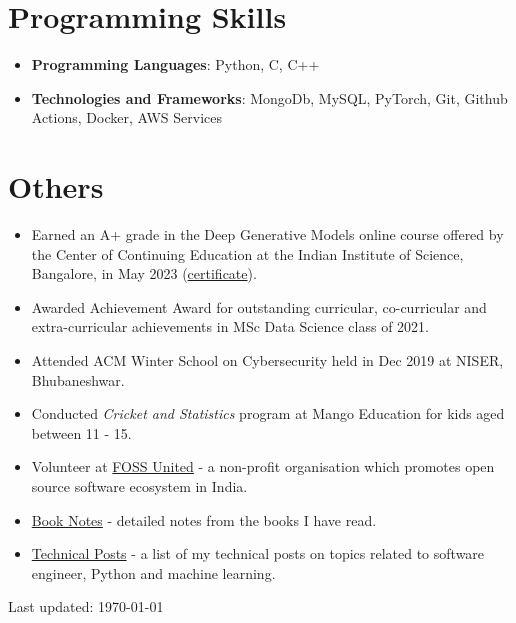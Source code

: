 \documentclass[letterpaper,11pt]{article}
\newcommand{\resumeItemSimple}[1]{
  \item\small{
    {#1 \vspace{-2pt}}
  }
}
\newcommand{\resumeSubItemSimple}[1]{\resumeItemSimple{#1}\vspace{-4pt}}
\newcommand{\resumeSubHeadingListStart}{\begin{itemize}[leftmargin=*]}
\newcommand{\resumeSubHeadingListEnd}{\end{itemize}}
\begin{document}
\section{Programming Skills}
  \resumeSubHeadingListStart
    \resumeSubItemSimple{\textbf{Programming Languages}{: Python, C, C++}}
    \resumeSubItemSimple{\textbf{Technologies and Frameworks}{: MongoDb, MySQL, PyTorch, Git, Github Actions, Docker, AWS Services}}
  \resumeSubHeadingListEnd

\section{Others}
  \resumeSubHeadingListStart
    \resumeSubItemSimple {Earned an A+ grade in the Deep Generative Models online course offered by the Center of Continuing Education at the Indian Institute of Science, Bangalore, in May 2023 (\href{https://www.arunppsg.in/assets/files/iisc_course_certificate.pdf}{certificate}).}
    \resumeSubItemSimple {Awarded Achievement Award for outstanding curricular, co-curricular and extra-curricular achievements in MSc Data Science class of 2021.}
    \resumeSubItemSimple {Attended ACM Winter School on Cybersecurity held in Dec 2019 at NISER, Bhubaneshwar.}
    \resumeSubItemSimple {Conducted \textit{Cricket and Statistics} program at Mango Education for kids aged between 11 - 15.}
    \resumeSubItemSimple {Volunteer at \href{https://fossunited.org/}{FOSS United} - a non-profit organisation which promotes open source software ecosystem in India.}
    \resumeSubItemSimple {\href{https://www.arunppsg.in/book-notes/}{Book Notes} - detailed notes from the books I have read.}
    \resumeSubItemSimple {\href{https://www.arunppsg.in/posts/}{Technical Posts} - a list of my technical posts on topics related to software engineer, Python and machine learning.}
  \resumeSubHeadingListEnd
%

\begin{footnotesize}
  Last updated: \today
\end{footnotesize}
\end{document}
